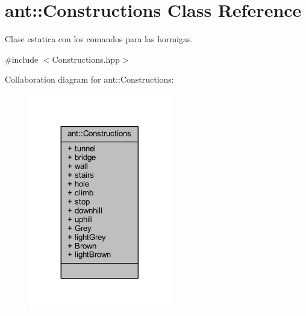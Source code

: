 \hypertarget{classant_1_1_constructions}{\section{ant\+:\+:Constructions Class Reference}
\label{classant_1_1_constructions}
}


Clase estatica con los comandos para las hormigas.  




{\ttfamily \#include $<$Constructions.\+hpp$>$}



Collaboration diagram for ant\+:\+:Constructions\+:
\nopagebreak
\begin{figure}[H]
\begin{center}
\leavevmode
\includegraphics[width=176pt]{d2/ddc/classant_1_1_constructions__coll__graph}
\end{center}
\end{figure}
